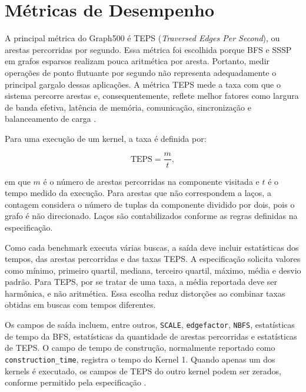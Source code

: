 \section{Métricas de Desempenho}
\label{sec:graph500-metricas}

A principal métrica do Graph500 é TEPS (\textit{Traversed Edges Per Second}), ou arestas percorridas por segundo. Essa métrica foi escolhida porque BFS e SSSP em grafos esparsos realizam pouca aritmética por aresta. Portanto, medir operações de ponto flutuante por segundo não representa adequadamente o principal gargalo dessas aplicações. A métrica TEPS mede a taxa com que o sistema percorre arestas e, consequentemente, reflete melhor fatores como largura de banda efetiva, latência de memória, comunicação, sincronização e balanceamento de carga \cite{graph500spec}.

Para uma execução de um kernel, a taxa é definida por:

\begin{equation}
\mathrm{TEPS} = \frac{m}{t},
\end{equation}

em que $m$ é o número de arestas percorridas na componente visitada e $t$ é o tempo medido da execução. Para arestas que não correspondem a laços, a contagem considera o número de tuplas da componente dividido por dois, pois o grafo é não direcionado. Laços são contabilizados conforme as regras definidas na especificação.

Como cada benchmark executa várias buscas, a saída deve incluir estatísticas dos tempos, das arestas percorridas e das taxas TEPS. A especificação solicita valores como mínimo, primeiro quartil, mediana, terceiro quartil, máximo, média e desvio padrão. Para TEPS, por se tratar de uma taxa, a média reportada deve ser harmônica, e não aritmética. Essa escolha reduz distorções ao combinar taxas obtidas em buscas com tempos diferentes.

Os campos de saída incluem, entre outros, \texttt{SCALE},
\texttt{edgefactor}, \texttt{NBFS}, estatísticas de tempo da BFS,
estatísticas da quantidade de arestas percorridas e estatísticas de TEPS. O
campo de tempo de construção, normalmente reportado como
\texttt{construction\_time}, registra o tempo do Kernel 1. Quando apenas um dos
kernels é executado, os campos de TEPS do outro kernel podem ser zerados,
conforme permitido pela especificação \cite{graph500spec}.


